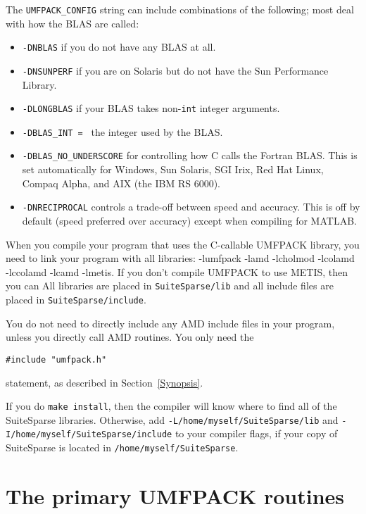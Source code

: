 \documentclass[11pt]{article}
\begin{document}
The {\tt UMFPACK\_CONFIG} string can include combinations of the following;
most deal with how the BLAS are called:
\begin{itemize}
\item {\tt -DNBLAS} if you do not have any BLAS at all.
\item {\tt -DNSUNPERF} if you are on Solaris but do not have the Sun
    Performance Library.
\item {\tt -DLONGBLAS} if your BLAS takes non-{\tt int} integer arguments.
\item {\tt -DBLAS\_INT = } the integer used by the BLAS.

\item {\tt -DBLAS\_NO\_UNDERSCORE}
    for controlling how C calls the Fortran BLAS.
    This is set automatically for Windows,
    Sun Solaris, SGI Irix, Red Hat Linux, Compaq Alpha, and
    AIX (the IBM RS 6000).

\item {\tt -DNRECIPROCAL} controls a trade-off between speed and accuracy.
    This is off by default (speed preferred over accuracy) except when
    compiling for MATLAB.
\end{itemize}

When you compile your program that uses the C-callable UMFPACK library,
you need to link your program with all libraries:
-lumfpack -lamd -lcholmod -lcolamd -lccolamd -lcamd -lmetis.
If you don't compile UMFPACK to use METIS, then you can  
All libraries are placed in {\tt SuiteSparse/lib} and all include
files are placed in {\tt SuiteSparse/include}.

You do not need to directly include any AMD include files in your
program, unless you directly call AMD routines.  You only need the
\begin{verbatim}
#include "umfpack.h"
\end{verbatim}
statement, as described in Section~\ref{Synopsis}.

If you do {\tt make install}, then the compiler will know where to
find all of the SuiteSparse libraries.  Otherwise, add
{\tt -L/home/myself/SuiteSparse/lib} and
{\tt -I/home/myself/SuiteSparse/include} to your compiler flags,
if your copy of SuiteSparse is located in {\tt /home/myself/SuiteSparse}.

\newpage
\section{The primary UMFPACK routines}
\label{Primary}
\end{document}
